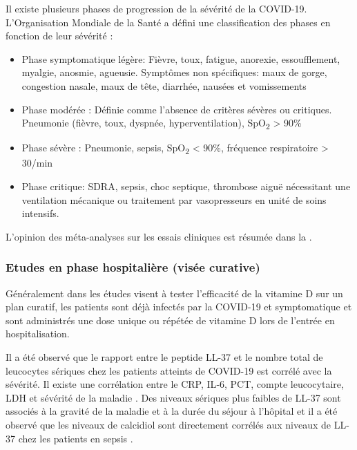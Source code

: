 \documentclass[
  a4paper,
  DIV=11,
  numbers=noendperiod,
  listof=totoc]{scrreprt}
\providecommand{\tightlist}{%
  \setlength{\itemsep}{0pt}\setlength{\parskip}{0pt}}\usepackage{longtable,booktabs,array}
\begin{document}
Il existe plusieurs phases de progression de la sévérité de la COVID-19.
L'Organisation Mondiale de la Santé a défini une classification des
phases en fonction de leur sévérité \autocite{WHO.2023.org,Agarwal.2020}
:

\begin{itemize}
\tightlist
\item
  Phase symptomatique légère: Fièvre, toux, fatigue, anorexie,
  essoufflement, myalgie, anosmie, agueusie. Symptômes non spécifiques:
  maux de gorge, congestion nasale, maux de tête, diarrhée, nausées et
  vomissements
\item
  Phase modérée : Définie comme l'absence de critères sévères ou
  critiques. Pneumonie (fièvre, toux, dyspnée, hyperventilation),
  SpO\textsubscript{2} \textgreater{} 90\%
\item
  Phase sévère : Pneumonie, sepsis, SpO\textsubscript{2} \textless{}
  90\%, fréquence respiratoire \textgreater{} 30/min
\item
  Phase critique: \ac{SDRA}, sepsis, choc septique, thrombose aiguë
  nécessitant une ventilation mécanique ou traitement par vasopresseurs
  en unité de soins intensifs.
\end{itemize}

L'opinion des méta-analyses sur les essais cliniques est résumée dans la
.

\subsubsection{Etudes en phase hospitalière (visée
curative)}\label{etudes-en-phase-hospitaliuxe8re-visuxe9e-curative}

Généralement dans les études visent à tester l'efficacité de la vitamine
D sur un plan curatif, les patients sont déjà infectés par la COVID-19
et symptomatique et sont administrés une dose unique ou répétée de
vitamine D lors de l'entrée en hospitalisation.

Il a été observé que le rapport entre le peptide LL-37 et le nombre
total de leucocytes sériques chez les patients atteints de COVID-19 est
corrélé avec la sévérité. Il existe une corrélation entre le CRP, IL‑6,
PCT, compte leucocytaire, LDH et sévérité de la maladie
\autocite{Keutmann.2022}. Des niveaux sériques plus faibles de LL-37
sont associés à la gravité de la maladie et à la durée du séjour à
l'hôpital \autocite{Keutmann.2022} et il a été observé que les niveaux
de calcidiol sont directement corrélés aux niveaux de LL-37 chez les
patients en sepsis \autocite{Cutuli.2024}.
\end{document}
